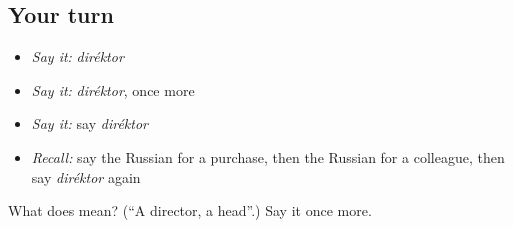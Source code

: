 \subsection*{Your turn}
\begin{itemize}
\raggedright
  \item \emph{Say it:} \emph{diréktor}
  \item \emph{Say it:} \emph{diréktor}, once more
  \item \emph{Say it:} say \emph{diréktor}
  \item \emph{Recall:} say the Russian for a purchase, then the Russian for a colleague, then say \emph{diréktor} again
\end{itemize}

\begin{tcolorbox}[breakable,colback=teal!4,colframe=teal!35!black,title={Before you move on}]
What does  mean? (\textquotedblleft{}A director, a head\textquotedblright{}.) Say it once more.
\end{tcolorbox}
